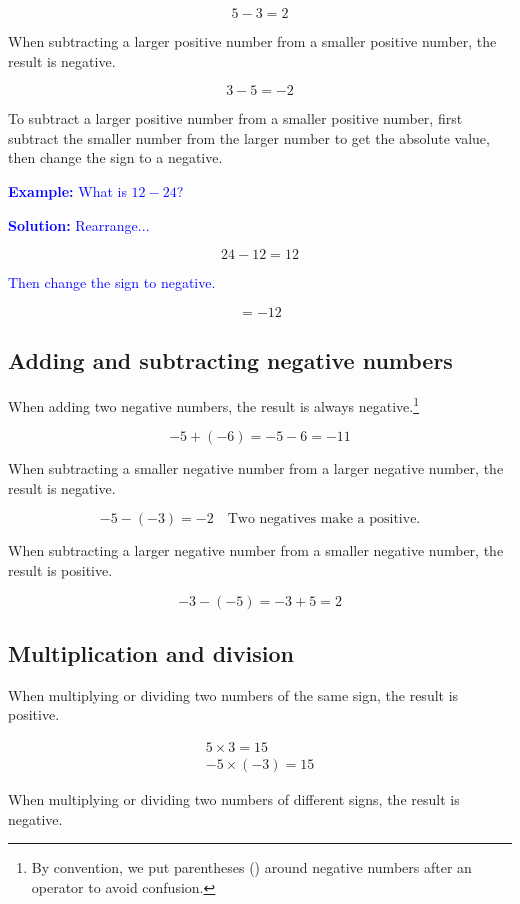 \documentclass[a4paper, 12pt]{article}
\begin{document}
$$ 5 - 3 = 2 $$

When subtracting a larger positive number from a smaller positive number, the result is negative.

$$ 3 - 5 = -2 $$

To subtract a larger positive number from a smaller positive number, first subtract the smaller number from the larger number to get the absolute value, then change the sign to a negative.

\textcolor{blue}{\textbf{Example:} What is $12 - 24$?}

\textcolor{blue}{\textbf{Solution:}  Rearrange...}

$$ 24 - 12 = 12 $$

\textcolor{blue}{Then change the sign to negative.}

$$ =\boxed{-12} $$

\subsection*{Adding and subtracting negative numbers}

When adding two negative numbers, the result is always negative.\footnote{By convention, we put parentheses () around negative numbers after an operator to avoid confusion.}

$$ -5 + (-6) = -5 - 6 = -11 $$

When subtracting a smaller negative number from a larger negative number, the result is negative.

$$ -5 - (-3) = -2 \quad \text{Two negatives make a positive.}$$

When subtracting a larger negative number from a smaller negative number, the result is positive.

$$ -3 - (-5) = -3 + 5 = 2 $$

\subsection*{Multiplication and division}

When multiplying or dividing two numbers of the same sign, the result is positive.

\begin{gather*}
5 \times 3 = 15 \\
-5 \times (-3) = 15
\end{gather*}

When multiplying or dividing two numbers of different signs, the result is negative.
\end{document}
